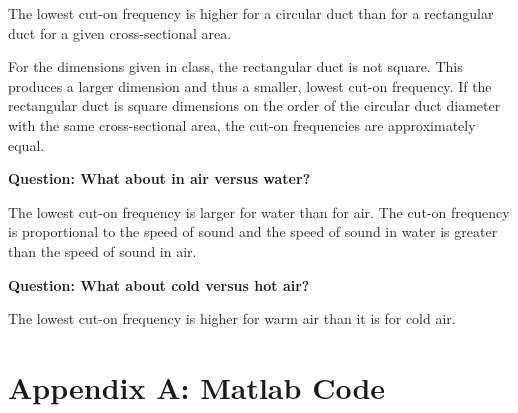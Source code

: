 The lowest cut-on frequency is higher for a circular duct than for a
 rectangular duct for a given cross-sectional area.

 For the dimensions given in class, the rectangular duct is not square.
 This produces a larger dimension and thus a smaller, lowest cut-on
 frequency.  If the rectangular duct is square dimensions on the order
 of the circular duct diameter with the same cross-sectional area, the
 cut-on frequencies are approximately equal.



\vspace{0.25cm}
\textbf{Question:  What about in air versus water?}

 The lowest cut-on frequency is larger for water than for air.  The cut-on
 frequency is proportional to the speed of sound and the speed of sound in
 water is greater than the speed of sound in air.



\vspace{0.25cm}
\textbf{Question:  What about cold versus hot air?}

 The lowest cut-on frequency is higher for warm air than it is for cold air.






\newpage
\section*{Appendix A:  Matlab Code}

